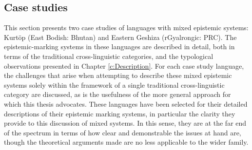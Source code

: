 \subsection{Case studies}\label{ss:Discussion:MixedCases}
This section presents two case studies of languages with mixed epistemic systems: Kurtöp (East Bodish: Bhutan) and Eastern Geshiza (rGyalrongic: PRC). The epistemic-marking systems in these languages are described in detail, both in terms of the traditional cross-linguistic categories, and the typological observations presented in Chapter \ref{c:Description}. For each case study language, the challenges that arise when attempting to describe these mixed epistemic systems solely within the framework of a single traditional cross-linguistic category are discussed, as is the usefulness of the more general approach for which this thesis advocates. These languages have been selected for their detailed descriptions of their epistemic marking systems, in particular the clarity they provide to this discussion of mixed systems. In this sense, they are at the far end of the spectrum in terms of how clear and demonstrable the issues at hand are, though the theoretical arguments made are no less applicable to the wider family.
